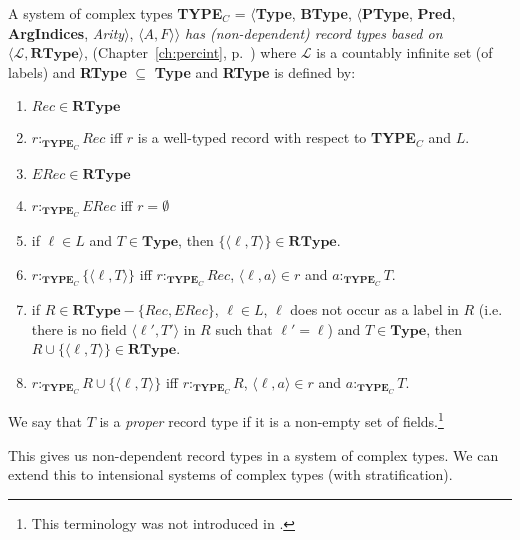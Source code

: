 A system of complex types \textbf{TYPE}$_C$ = $\langle${\bf Type}, {\bf BType},
$\langle$\textbf{PType}, {\bf Pred}, \textbf{ArgIndices}, {\it
  Arity\/}$\rangle$, $\langle A,F\rangle$$\rangle$ \textit{has
  (non-dependent) record
  types based on $\langle \mathcal{L}, \mathbf{RType}\rangle$},
(Chapter~\ref{ch:percint}, p.~\pageref{ex:ndrectypes}) where $\mathcal{L}$ is a countably infinite set (of labels)
and \textbf{RType} $\subseteq$ \textbf{Type} and \textbf{RType} is
defined by:
\begin{enumerate} 
 
\item $\mathit{Rec}\in\mathbf{RType}$

\item $r:_{\mathbf{TYPE}_C}\mathit{Rec}$ iff $r$ is a well-typed record with
  respect to \textbf{TYPE$_C$} and $L$.

\item $\mathit{ERec}\in\mathbf{RType}$

\item $r:_{\mathbf{TYPE}_C}\mathit{ERec}$ iff $r=\emptyset$

\item if $\ell\in L$ and $T\in\mathbf{Type}$, then
  $\{\langle\ell,T\rangle\}\in\mathbf{RType}$.

\item $r:_{\mathbf{TYPE}_C}\{\langle\ell,T\rangle\}$ iff
  $r:_{\mathbf{TYPE}_C}\mathit{Rec}$, $\langle\ell,a\rangle\in r$ and
  $a:_{\mathbf{TYPE}_C}T$.

\item if $R\in\mathbf{RType}-\{\mathit{Rec},\mathit{ERec}\}$, $\ell\in L$, $\ell$ does not occur as a
  label in $R$ (i.e. there is no field $\langle\ell',T'\rangle$ in $R$
  such that $\ell'=\ell$) and $T\in\mathbf{Type}$, then
  $R\cup\{\langle\ell,T\rangle\}\in\mathbf{RType}$.\label{cl:ndrectype-emb}

\item $r:_{\mathbf{TYPE}_C}R\cup\{\langle\ell,T\rangle\}$ iff
  $r:_{\mathbf{TYPE}_C}R$, $\langle\ell,a\rangle\in r$ and $a:_{\mathbf{TYPE}_C}T$.
 
\end{enumerate}

We say that $T$ is a \textit{proper} record type if it is a non-empty
set of fields.\footnote{This terminology was not introduced in \cite{Cooper2012}.}\label{pg:proprectype} 

This gives us non-dependent record types in a system of complex types.
We can extend this to intensional systems of complex types (with
stratification).  

